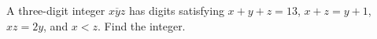 A three-digit integer $\overline{xyz}$ has digits satisfying $x+y+z=13$, $x+z=y+1$, $xz=2y$, and $x<z$. Find the integer.

